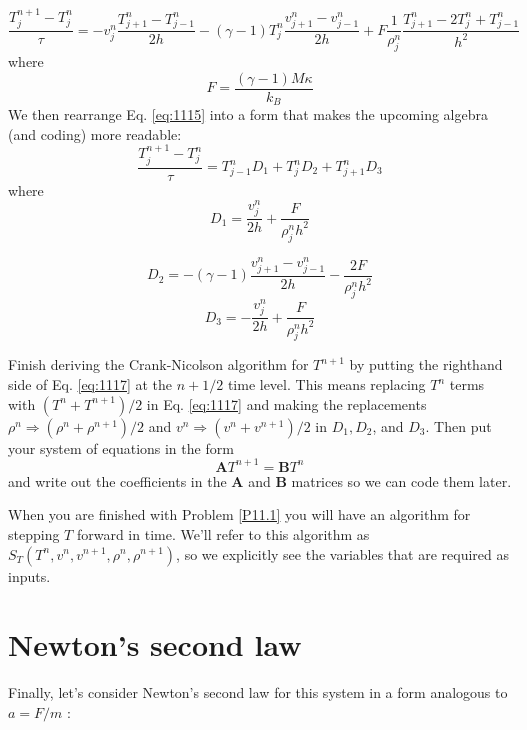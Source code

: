 \begin{equation}\label{eq:1115}
\frac{T_{j}^{n+1}-T_{j}^{n}}{\tau}=-v_{j}^{n} \frac{T_{j+1}^{n}-T_{j-1}^{n}}{2 h}-(\gamma-1) T_{j}^{n} \frac{v_{j+1}^{n}-v_{j-1}^{n}}{2 h}+F \frac{1}{\rho_{j}^{n}} \frac{T_{j+1}^{n}-2 T_{j}^{n}+T_{j-1}^{n}}{h^{2}}
\end{equation}
where
\begin{equation}\label{eq:1116}
F=\frac{(\gamma-1) M \kappa}{k_{B}}
\end{equation}
We then rearrange Eq. \eqref{eq:1115} into a form that makes the upcoming algebra (and
coding) more readable:
\begin{equation}\label{eq:1117}
\frac{T_{j}^{n+1}-T_{j}^{n}}{\tau}=T_{j-1}^{n} D_{1}+T_{j}^{n} D_{2}+T_{j+1}^{n} D_{3}
\end{equation}
where
\begin{equation}\label{eq:1118}
D_{1}=\frac{v_{j}^{n}}{2 h}+\frac{F}{\rho_{j}^{n} h^{2}}
\end{equation}

\begin{equation}\label{eq:1119}
D_{2}=-(\gamma-1) \frac{v_{j+1}^{n}-v_{j-1}^{n}}{2 h}-\frac{2 F}{\rho_{j}^{n} h^{2}}
\end{equation}
\begin{equation}\label{eq:1120}
D_{3}=-\frac{v_{j}^{n}}{2 h}+\frac{F}{\rho_{j}^{n} h^{2}}
\end{equation}
\begin{problem}\label{P11.1}
Finish deriving the Crank-Nicolson algorithm for $T^{n+1}$ by putting the righthand side of Eq. \eqref{eq:1117} at the $n+1 / 2$ time level. This means replacing $T^{n}$ terms with $\left(T^{n}+T^{n+1}\right) / 2$ in Eq. \eqref{eq:1117} and making the replacements $\rho^{n} \Rightarrow\left(\rho^{n}+\rho^{n+1}\right) / 2$ and $v^{n} \Rightarrow\left(v^{n}+v^{n+1}\right) / 2$ in $D_{1}, D_{2}$, and $D_{3}$. Then put your system of equations in the form
\begin{equation*}
\mathbf{A} T^{n+1}=\mathbf{B} T^{n}
\end{equation*}
and write out the coefficients in the $\mathbf{A}$ and $\mathbf{B}$ matrices so we can code them later.\end{problem}
When you are finished with Problem \ref{P11.1} you will have an algorithm for stepping $T$ forward in time. We'll refer to this algorithm as $S_{T}\left(T^{n}, v^{n}, v^{n+1}, \rho^{n}, \rho^{n+1}\right)$, so we explicitly see the variables that are required as inputs.
\section*{Newton\rq s second law}
Finally, let\rq s consider Newton\rq s second law for this system in a form analogous to $a=F / m$ :

